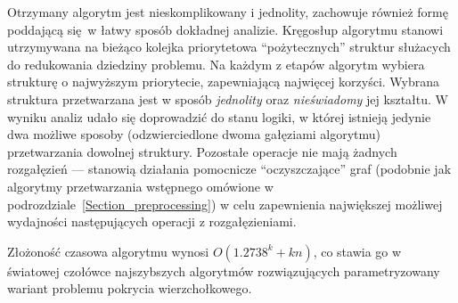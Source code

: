 \par {
  Otrzymany algorytm jest nieskomplikowany i jednolity, zachowuje również formę poddającą się w łatwy sposób dokładnej analizie.
  Kręgosłup algorytmu stanowi utrzymywana na bieżąco kolejka priorytetowa ``pożytecznych'' struktur służacych do redukowania dziedziny problemu.
  Na każdym z etapów algorytm wybiera strukturę o najwyższym priorytecie, zapewniającą najwięcej korzyści.
  Wybrana struktura przetwarzana jest w sposób \emph{jednolity} oraz \emph{nieświadomy} jej kształtu.
  W wyniku analiz udało się doprowadzić do stanu logiki, w której istnieją jedynie dwa możliwe sposoby (odzwierciedlone dwoma gałęziami algorytmu) przetwarzania dowolnej struktury.
  Pozostałe operacje nie mają żadnych rozgałęzień --- stanowią działania pomocnicze ``oczyszczające'' graf (podobnie jak algorytmy przetwarzania wstępnego omówione w podrozdziale~\ref{Section_preprocessing}) w celu zapewnienia największej możliwej wydajności następujących operacji z rozgałęzieniami.

  Złożoność czasowa algorytmu wynosi $O(1.2738^k + kn)$, co stawia go w światowej czołówce najszybszych algorytmów rozwiązujących parametryzowany wariant problemu pokrycia wierzchołkowego.
}
